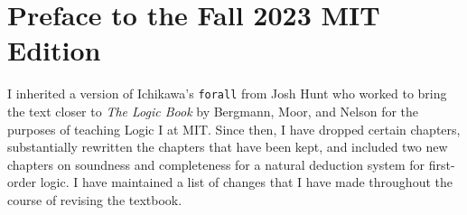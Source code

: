 
\chapter*{Preface to the Fall 2023 MIT Edition}
\label{ch.preface2}

I inherited a version of Ichikawa's {\tt forall} from Josh Hunt who worked to bring the text closer to \textit{The Logic Book} by Bergmann, Moor, and Nelson for the purposes of teaching Logic I at MIT.
Since then, I have dropped certain chapters, substantially rewritten the chapters that have been kept, and included two new chapters on soundness and completeness for a natural deduction system for first-order logic.
I have maintained a list of changes that I have made throughout the course of revising the textbook.

